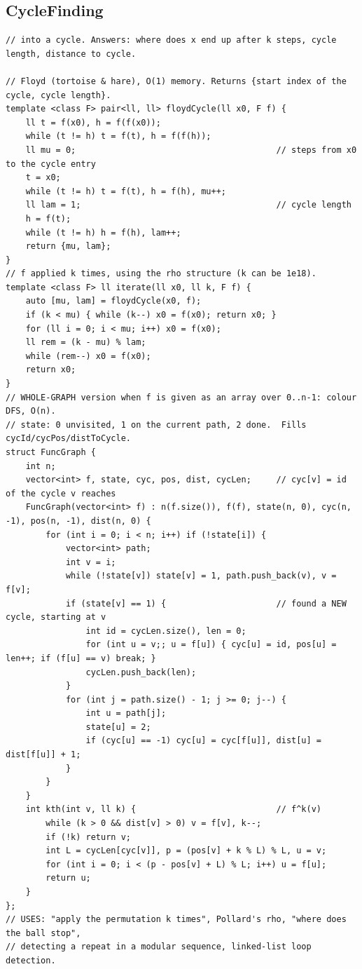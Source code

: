 \documentclass[9pt,a4paper,twocolumn]{extarticle}
\begin{document}
\filbreak
\subsection{CycleFinding}
\nopagebreak
\begin{lstlisting}
// into a cycle. Answers: where does x end up after k steps, cycle length, distance to cycle.

// Floyd (tortoise & hare), O(1) memory. Returns {start index of the cycle, cycle length}.
template <class F> pair<ll, ll> floydCycle(ll x0, F f) {
    ll t = f(x0), h = f(f(x0));
    while (t != h) t = f(t), h = f(f(h));
    ll mu = 0;                                        // steps from x0 to the cycle entry
    t = x0;
    while (t != h) t = f(t), h = f(h), mu++;
    ll lam = 1;                                       // cycle length
    h = f(t);
    while (t != h) h = f(h), lam++;
    return {mu, lam};
}
// f applied k times, using the rho structure (k can be 1e18).
template <class F> ll iterate(ll x0, ll k, F f) {
    auto [mu, lam] = floydCycle(x0, f);
    if (k < mu) { while (k--) x0 = f(x0); return x0; }
    for (ll i = 0; i < mu; i++) x0 = f(x0);
    ll rem = (k - mu) % lam;
    while (rem--) x0 = f(x0);
    return x0;
}
// WHOLE-GRAPH version when f is given as an array over 0..n-1: colour DFS, O(n).
// state: 0 unvisited, 1 on the current path, 2 done.  Fills cycId/cycPos/distToCycle.
struct FuncGraph {
    int n;
    vector<int> f, state, cyc, pos, dist, cycLen;     // cyc[v] = id of the cycle v reaches
    FuncGraph(vector<int> f) : n(f.size()), f(f), state(n, 0), cyc(n, -1), pos(n, -1), dist(n, 0) {
        for (int i = 0; i < n; i++) if (!state[i]) {
            vector<int> path;
            int v = i;
            while (!state[v]) state[v] = 1, path.push_back(v), v = f[v];
            if (state[v] == 1) {                      // found a NEW cycle, starting at v
                int id = cycLen.size(), len = 0;
                for (int u = v;; u = f[u]) { cyc[u] = id, pos[u] = len++; if (f[u] == v) break; }
                cycLen.push_back(len);
            }
            for (int j = path.size() - 1; j >= 0; j--) {
                int u = path[j];
                state[u] = 2;
                if (cyc[u] == -1) cyc[u] = cyc[f[u]], dist[u] = dist[f[u]] + 1;
            }
        }
    }
    int kth(int v, ll k) {                            // f^k(v)
        while (k > 0 && dist[v] > 0) v = f[v], k--;
        if (!k) return v;
        int L = cycLen[cyc[v]], p = (pos[v] + k % L) % L, u = v;
        for (int i = 0; i < (p - pos[v] + L) % L; i++) u = f[u];
        return u;
    }
};
// USES: "apply the permutation k times", Pollard's rho, "where does the ball stop",
// detecting a repeat in a modular sequence, linked-list loop detection.
\end{lstlisting}
\end{document}

